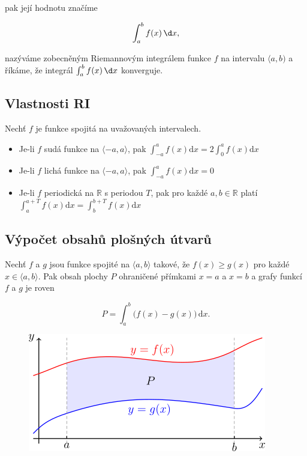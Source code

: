 \documentclass{szzclass}
\begin{document}
pak její hodnotu značíme

\begin{equation*}
\int_a^b f(x)\, \d x,\end{equation*}

nazýváme zobecněným Riemannovým integrálem funkce $f$
na intervalu $\langle a,b )$ a říkáme, že integrál
$\int_a^b f(x)\, \d x$ konverguje.

\subsection{Vlastnosti RI}
Nechť $f$ je funkce spojitá na uvažovaných intervalech.
\begin{itemize}
    \item Je-li $f$ sudá funkce na $\langle -a,a \rangle$, pak
    $\displaystyle\int_{-a}^a f(x) \mathrm{d}x = 2 \int_0^a f(x) \mathrm{d}x$
    \item Je-li $f$ lichá funkce na $\langle -a,a \rangle$, pak
    $\displaystyle\int_{-a}^a f(x) \mathrm{d}x = 0$
    \item Je-li $f$ periodická na $\mathbb{R}$ s periodou $T$, pak pro každé $a,b\in\mathbb{R}$ platí
    $\displaystyle\int_a^{a+T} f(x)\mathrm{d}x = \int_b^{b+T} f(x) \mathrm{d}x$
\end{itemize}

\subsection{Výpočet obsahů plošných útvarů}
Nechť $f$ a $g$ jsou funkce spojité na $\langle a,b \rangle$
takové, že $f(x)\geq g(x)$ pro každé $x\in\langle a,b \rangle$.
Pak obsah plochy $P$ ohraničené přímkami $x=a$ a $x=b$ a grafy
funkcí $f$ a $g$ je roven

\begin{equation*}
P = \int_a^b \big( f(x) - g(x) \big) \,\mathrm{d}x.\end{equation*}

\begin{figure}[h]
    \includegraphics[width=.5\textwidth, center]{topics/bi-spol-35/images/fig_vypocet_plochy.png}
\end{figure}
\end{document}
